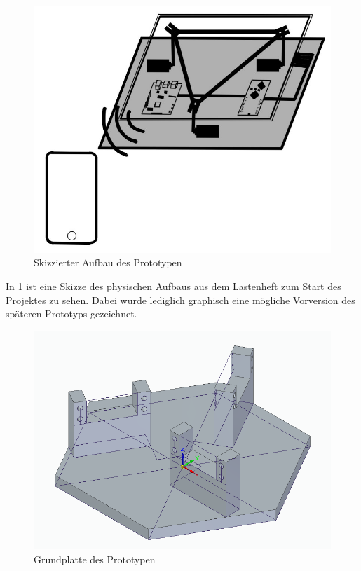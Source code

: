 \documentclass[12pt,a4paper,bibliography=totoc,listof=totoc]{scrartcl}
\begin{document}
\begin{figure}[htbp]
	\centering
	\includegraphics[scale = 0.9]{pics/SkizzeAufbau}
	\caption{Skizzierter Aufbau des Prototypen}
	\label{fig:Skizze}
\end{figure}

In \ref{fig:Skizze} ist eine Skizze des physischen Aufbaus aus dem Lastenheft zum Start des Projektes zu 
sehen. Dabei wurde lediglich graphisch eine mögliche Vorversion des späteren Prototyps gezeichnet. 

\begin{figure}[htbp]
	\centering
	\includegraphics[scale = 0.45]{pics/BildGrundplatte}
	\caption{Grundplatte des Prototypen}
	\label{fig:Grundplatte}
\end{figure}
\end{document}
